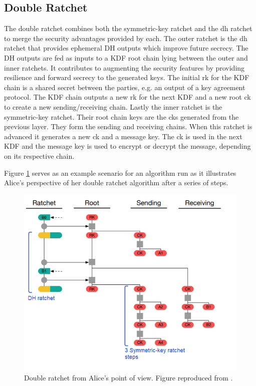 \subsection{Double Ratchet}
The double ratchet combines both the symmetric-key ratchet and the \gls{dh} ratchet to merge the security advantages provided by each. The outer ratchet is the \gls{dh} ratchet that provides ephemeral DH outputs which improve future secrecy. The DH outputs are fed as inputs to a KDF root chain lying between the outer and inner ratchets. It contributes to augmenting the security features by providing resilience and forward secrecy to the generated keys. The initial \gls{rk} for the KDF chain is a shared secret between the parties, e.g. an output of a key agreement protocol. The KDF chain outputs a new \gls{rk} for the next KDF and a new root \gls{ck} to create a new sending/receiving chain. Lastly the inner ratchet is the symmetric-key ratchet. Their root chain keys are the \gls{ck}s generated from the previous layer. They form the sending and receiving chains. When this ratchet is advanced it generates a new \gls{ck} and a message key. The \gls{ck} is used in the next KDF and the message key is used to encrypt or decrypt the message, depending on its respective chain. 
\par
Figure \ref{fig:AliceDR} serves as an example scenario for an algorithm run as it illustrates Alice's perspective of her double ratchet algorithm after a series of steps. 
\begin{figure}[hptb]
	\centering
	\includegraphics[scale=0.5]{Images/dr.png}
	\caption{Double ratchet from Alice's point of view. Figure reproduced from \cite{dblRtcht}.}
	\label{fig:AliceDR}
\end{figure}
